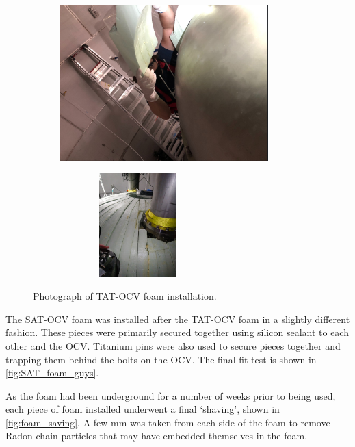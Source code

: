 \begin{figure}[!tbph]
\begin{subfigure}{.5\textwidth}
  \centering
  \includegraphics[height=6cm, width=\linewidth]{Figures/Construction/TAT_foam_installation.png}
  \end{subfigure}
  \begin{subfigure}{.5\textwidth}
  \centering
  \includegraphics[height=4cm, width=6cm, angle=-90, width=\linewidth]{Figures/Construction/TAT_foam_complete.jpg}
  \end{subfigure}
\caption{Photograph of TAT-OCV foam installation.}
\label{fig:TAT_foam_installation}
\end{figure}

\par
The SAT-OCV foam was installed after the TAT-OCV foam in a slightly different fashion.
These pieces were primarily secured together using silicon sealant \cite{dowsil_silicone_ref} to each other and the OCV.
Titanium pins were also used to secure pieces together and trapping them behind the bolts on the OCV.
The final fit-test is shown in \autoref{fig:SAT_foam_guys}.

\par
As the foam had been underground for a number of weeks prior to being used, each piece of foam installed underwent a final `shaving', shown in \autoref{fig:foam_saving}.
A few mm was taken from each side of the foam to remove Radon chain particles that may have embedded themselves in the foam.

